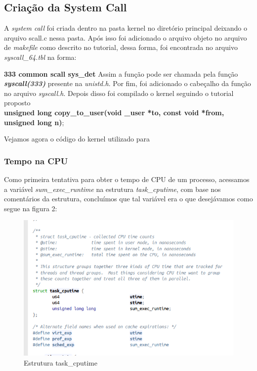 \documentclass[12pt]{article}
\begin{document}
\subsection*{Criação da System Call}
A \textit{system call} foi criada dentro na pasta kernel no diretório principal deixando o arquivo  scall.c nessa pasta. Após isso foi adicionado o arquivo objeto no arquivo de \textit{makefile} como descrito no tutorial, dessa forma, foi encontrada no arquivo \textit{syscall\_64.tbl} na forma: \newline

\textbf{333	common	scall			sys\_det}
\newline
Assim a função pode ser chamada pela função \textit{\textbf{syscall(333)}} presente na \textit{unistd.h}. Por fim, foi adicionado o cabeçalho da função no arquivo \textit{syscall.h}. Depois disso foi compilado o kernel seguindo o tutorial proposto  %
\\ \newline
\scriptsize{\textbf{unsigned long copy\_to\_user(void \_user *to, const void *from, unsigned long n)};}
\newline
	
Vejamos agora o código do kernel utilizado para

\subsubsection*{Tempo na CPU}
Como primeira tentativa para obter o tempo de CPU de um processo, acessamos a variável \textit{sum\_exec\_runtime} na estrutura \textit{task\_cputime}, com base nos comentários da estrutura, concluímos que tal variável era o que desejávamos como segue na figura 2: %

\vspace*{0.2cm}
\begin{figure}[!h]
	\centering
	\includegraphics[scale=0.5]{imagens/img1.png}
	\caption{Estrutura task\_cputime}
	\label{taskcputime}
\end{figure}
\vspace*{0.2cm}
\end{document}
